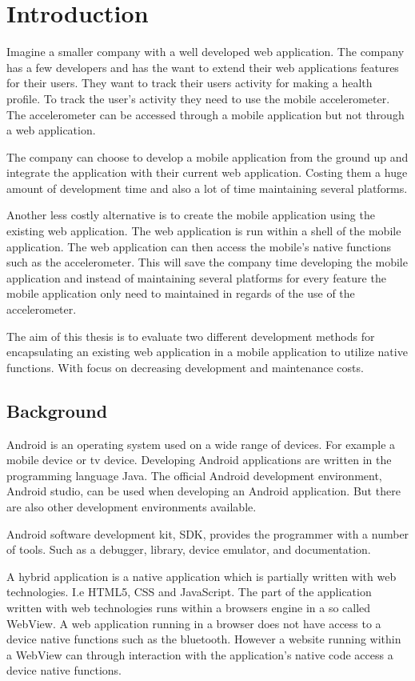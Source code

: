 \chapter{Introduction}
Imagine a smaller company with a well developed web application. The company has a few developers and has the want to extend their web applications features for their users. They want to track their users activity for making a health profile. To track the user's activity they need to use the mobile accelerometer. The accelerometer can be accessed through a mobile application but not through a web application. 

The company can choose to develop a mobile application from the ground up and integrate the application with their current web application. Costing them a huge amount of development time and also a lot of time maintaining several platforms.

Another less costly alternative is to create the mobile application using the existing web application. The web application is run within a shell of the mobile application. The web application can then access the mobile’s native functions such as the accelerometer. This will save the company time developing the mobile application and instead of maintaining several platforms for every feature the mobile application only need to maintained in regards of the use of the accelerometer. 

The aim of this thesis is to evaluate two different development methods for encapsulating an existing web application in a mobile application to utilize native functions. With focus on decreasing development and maintenance costs.


\section{Background}
Android is an operating system used on a wide range of devices. For example a mobile device or tv device. Developing Android applications are written in the programming language Java. The official Android development environment, Android studio, can be used when developing an Android application. But there are also other development environments available. 

Android software development kit, SDK, provides the programmer with a number of tools. Such as a debugger, library, device emulator, and documentation.  

A hybrid application is a native application which is partially written with web technologies. I.e HTML5, CSS and JavaScript. The part of the application written with web technologies runs within a browsers engine in a so called WebView. A web application running in a browser does not have access to a device native functions such as the bluetooth. However a website running within a WebView can through interaction with the application's native code access a device native functions.

